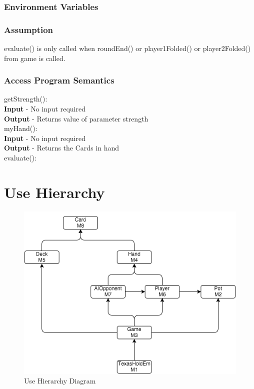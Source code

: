 \documentclass[11pt]{article}
\begin{document}
    \subsubsection{Environment Variables}
    \subsubsection{Assumption}
    evaluate() is only called when roundEnd() or player1Folded() or player2Folded() from game is called.
    \subsubsection{Access Program Semantics}
    getStrength():\\
    \textbf{Input} - No input required\\
    \textbf{Output} - Returns value of parameter strength\\
    myHand():\\
    \textbf{Input} - No input required\\
    \textbf{Output} - Returns the Cards in hand\\
    evaluate():\\
 	
    \section{Use Hierarchy}
    \begin{figure}[h]
		\includegraphics[scale=0.7]{Uses.png}
		\caption{Use Hierarchy Diagram}
		\label{fig1: Figure1}
		\end{figure}
	\newpage
\end{document}
